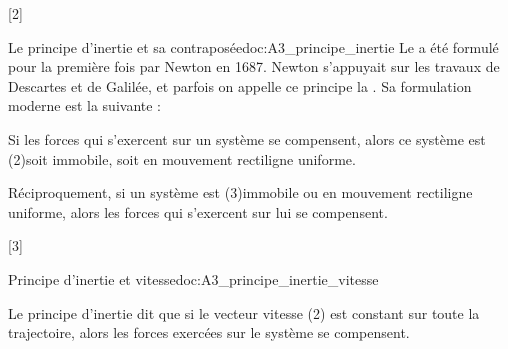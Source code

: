 [2]



\begin{doc}{Le principe d'inertie et sa contraposée}{doc:A3_principe_inertie}
  \chevron Le  a été formulé pour la première fois par Newton en 1687.
  Newton s'appuyait sur les travaux de Descartes et de Galilée, et parfois on appelle ce principe la .
  Sa formulation moderne est la suivante :
  
  \begin{importants}
    Si les forces qui s'exercent sur un système se compensent, alors ce système est \texteTrou(2){soit immobile, soit en mouvement rectiligne uniforme.}
  \end{importants}
  
  \begin{importants}
    Réciproquement, si un système est
    \texteTrou(3){immobile ou en mouvement rectiligne uniforme, alors les forces qui s'exercent sur lui se compensent.}
  \end{importants}
\end{doc}


[3]

\begin{doc}{Principe d'inertie et vitesse}{doc:A3_principe_inertie_vitesse}
  \begin{importants}
    Le principe d'inertie dit que si le vecteur vitesse
    \texteTrou(2){
      est constant sur toute la trajectoire, alors les forces exercées sur le système se compensent.
    }
  \end{importants}
\end{doc}